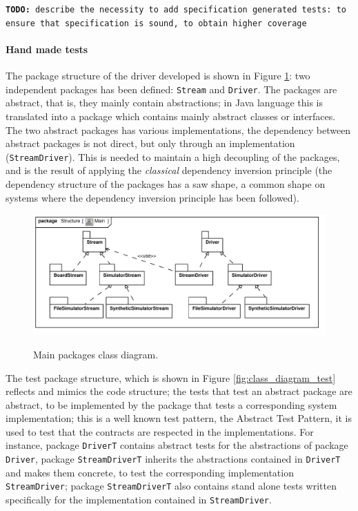 \documentclass{article} \usepackage{times}
\newcommand{\lil}[1]{\texttt{\lstinline|#1|}}
\newcommand{\todo}[1]{\texttt{\textbf{TODO:} #1}}
\begin{document}
\todo{describe the necessity to add specification generated tests: to ensure
that specification is sound, to obtain higher coverage}

\paragraph*{Hand made tests}

The package structure of the driver developed is shown in Figure 
\ref{fig:class_diagram_main}: two independent packages has been defined: 
\lil{Stream} and \lil{Driver}.
The packages are abstract, that is, they mainly contain abstractions; in Java 
language this is translated into a package which contains mainly abstract classes 
or interfaces.
The two abstract packages has various implementations, the dependency between
abstract packages is not direct, but only through an implementation 
(\lil{StreamDriver}).
This is needed to maintain a high decoupling of the packages, and is the result of 
applying the \emph{classical} dependency inversion 
principle\cite{martin1996dependency} (the dependency structure of the 
packages has a saw shape, a common shape on systems where the dependency 
inversion principle has been followed).

\begin{figure}[htb!]
 \centering
 \includegraphics[scale=0.7]{UML_model/Class_Diagram__Structure__Main}
 \label{fig:class_diagram_main}
 \caption{Main packages class diagram.}
\end{figure}

The test package structure, which is shown in Figure 
\ref{fig:class_diagram_test} reflects and mimics the code structure; the
tests that test an abstract package are abstract, to be implemented by the 
package that tests a corresponding system implementation; this is a well 
known test pattern, the Abstract Test Pattern\cite{thomas2004java}, it is 
used to test that the contracts are respected in the implementations.
For instance, package \lil{DriverT} contains abstract tests for the 
abstractions of package \lil{Driver}, package \lil{StreamDriverT} 
inherits the abstractions contained in \lil{DriverT} and makes them concrete, 
to test the corresponding implementation \lil{StreamDriver}; package 
\lil{StreamDriverT} also contains stand alone tests written specifically for
the implementation contained in \lil{StreamDriver}.
\end{document}
